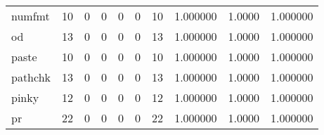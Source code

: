 \begin{tabular}{lrrrrrrrrr}
numfmt    &                                       10 &                                                  0 &                                                  0 &                                                  0 &                                                  0 &                                                 10 &                                           1.000000 &                                 1.0000 &                             1.000000 \\
od        &                                       13 &                                                  0 &                                                  0 &                                                  0 &                                                  0 &                                                 13 &                                           1.000000 &                                 1.0000 &                             1.000000 \\
paste     &                                       10 &                                                  0 &                                                  0 &                                                  0 &                                                  0 &                                                 10 &                                           1.000000 &                                 1.0000 &                             1.000000 \\
pathchk   &                                       13 &                                                  0 &                                                  0 &                                                  0 &                                                  0 &                                                 13 &                                           1.000000 &                                 1.0000 &                             1.000000 \\
pinky     &                                       12 &                                                  0 &                                                  0 &                                                  0 &                                                  0 &                                                 12 &                                           1.000000 &                                 1.0000 &                             1.000000 \\
pr        &                                       22 &                                                  0 &                                                  0 &                                                  0 &                                                  0 &                                                 22 &                                           1.000000 &                                 1.0000 &                             1.000000 \\

\end{tabular}
